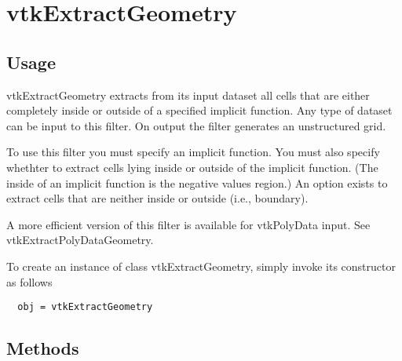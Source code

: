 \section{vtkExtractGeometry}

\subsection{Usage}

 vtkExtractGeometry extracts from its input dataset all cells that are either
 completely inside or outside of a specified implicit function. Any type of
 dataset can be input to this filter. On output the filter generates an
 unstructured grid.

 To use this filter you must specify an implicit function. You must also
 specify whethter to extract cells lying inside or outside of the implicit 
 function. (The inside of an implicit function is the negative values 
 region.) An option exists to extract cells that are neither inside or
 outside (i.e., boundary).

 A more efficient version of this filter is available for vtkPolyData input.
 See vtkExtractPolyDataGeometry.

To create an instance of class vtkExtractGeometry, simply
invoke its constructor as follows
\begin{verbatim}
  obj = vtkExtractGeometry
\end{verbatim}
\subsection{Methods}

